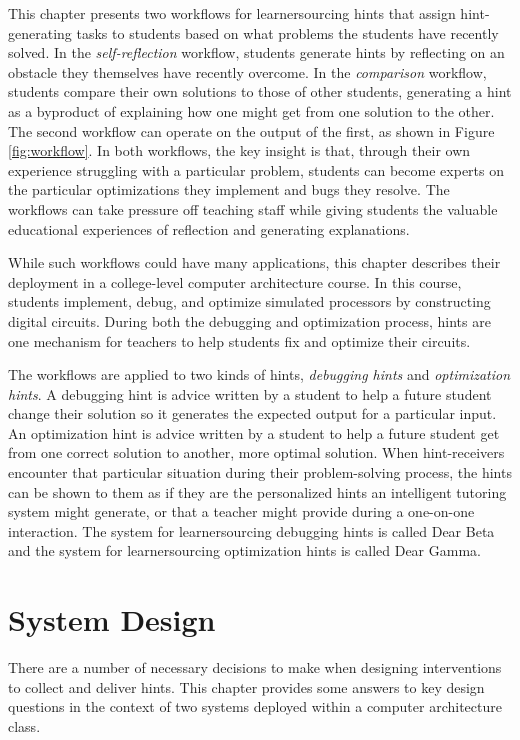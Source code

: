This chapter presents two workflows for learnersourcing hints that assign hint-generating tasks to students based on what problems the students have recently solved. In the \textit{self-reflection} workflow, students generate hints by reflecting on an obstacle they themselves have recently overcome. In the \textit{comparison} workflow, students compare their own solutions to those of other students, generating a hint as a byproduct of explaining how one might get from one solution to the other. The second workflow can operate on the output of the first, as shown in Figure \ref{fig:workflow}. In both workflows, the key insight is that, through their own experience struggling with a particular problem, students can become experts on the particular optimizations they implement and bugs they resolve. The workflows can take pressure off teaching staff while giving students the valuable educational experiences of reflection and generating explanations. 

While such workflows could have many applications, this chapter describes their deployment in a college-level computer architecture course. In this course, students implement, debug, and optimize simulated processors by constructing digital circuits. During both the debugging and optimization process, hints are one mechanism for teachers to help students fix and optimize their circuits. 

The workflows are applied to two kinds of hints, \textit{debugging hints} and \textit{optimization hints}. A debugging hint is advice written by a student to help a future student change their solution so it generates the expected output for a particular input. An optimization hint is advice written by a student to help a future student get from one correct solution to another, more optimal solution. When hint-receivers encounter that particular situation during their problem-solving process, the hints can be shown to them as if they are the personalized hints an intelligent tutoring system might generate, or that a teacher might provide during a one-on-one interaction. The system for learnersourcing debugging hints is called Dear Beta and the system for learnersourcing optimization hints is called Dear Gamma.

\section{System Design}
There are a number of necessary decisions to make when designing interventions to collect and deliver hints. This chapter provides some answers to key design questions in the context of two systems deployed within a computer architecture class.%


